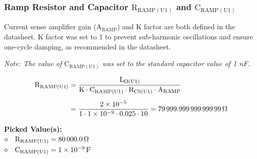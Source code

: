 \documentclass[11pt, a4paper]{article}
\begin{document}
\subsubsection{Ramp Resistor and Capacitor \texorpdfstring{$\mathrm{R_{RAMP(U1)}}$ and $\mathrm{C_{RAMP(U1)}}$}{CRAMP(U1)}}
Current sense amplifier gain ($\mathrm{A_{RAMP}}$) and K factor are both defined in the datasheet. K factor was set to 1 to prevent sub-harmonic oscillations and ensure one-cycle damping, as recommended in the datasheet. \\[1em]
{\small\itshape Note: The value of $\mathrm{C_{RAMP(U1)}}$ was set to the standard capacitor value of 1 nF. \par}
\begin{align}
\mathrm{R_{RAMP(U1)}} &= \frac{\mathrm{L_{O(U1)}}}{\mathrm{K} \cdot \mathrm{C_{RAMP(U1)}} \cdot \mathrm{R_{CS(U1)}} \cdot \mathrm{A_{RAMP}}} \nonumber \\[0.5em]
                      &= \frac{\num{2e-05}}{1 \cdot \num{1e-09} \cdot \num{0.025} \cdot 10} = \qty{79999.99999999999}{\ohm}
\end{align}
\begin{pickedbox}
\small\textbf{Picked Value(s):}\\[0.5em]
$\diamond\quad \mathrm{R_{RAMP(U1)}} = \qty{80000.0}{\ohm}$ \\[0.25em]
$\diamond\quad \mathrm{C_{RAMP(U1)}} = \qty{1e-09}{\farad}$
\end{pickedbox}
\end{document}
